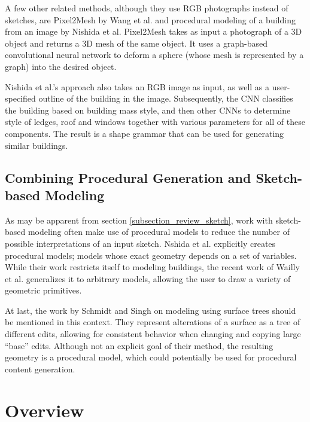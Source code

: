 \documentclass[english]{article}
\begin{document}
A few other related methods, although they use RGB photographs instead of sketches, are Pixel2Mesh \cite{pixel2mesh} by Wang et al. and procedural modeling of a building from an image \cite{procedural_building_from_image} by Nishida et al. Pixel2Mesh takes as input a photograph of a 3D object and returns a 3D mesh of the same object. It uses a graph-based convolutional neural network to deform a sphere (whose mesh is represented by a graph) into the desired object.

Nishida et al.'s approach also takes an RGB image as input, as well as a user-specified outline of the building in the image. Subsequently, the CNN classifies the building based on building mass style, and then other CNNs to determine style of ledges, roof and windows together with various parameters for all of these components. The result is a shape grammar that can be used for generating similar buildings.

\subsection{Combining Procedural Generation and Sketch-based Modeling}

As may be apparent from section \ref{subsection_review_sketch}, work with sketch-based modeling often make use of procedural models to reduce the number of possible interpretations of an input sketch. Nshida et al. \cite{sketch_based_urban_modeling} explicitly creates procedural models; models whose exact geometry depends on a set of variables. While their work restricts itself to modeling buildings, the recent work of Wailly et al. \cite{sketching_parameterized_models} generalizes it to arbitrary models, allowing the user to draw a variety of geometric primitives.

At last, the work by Schmidt and Singh \cite{schmidt08} on modeling using surface trees should be mentioned in this context. They represent alterations of a surface as a tree of different edits, allowing for consistent behavior when changing and copying large ``base'' edits. Although not an explicit goal of their method, the resulting geometry is a procedural model, which could potentially be used for procedural content generation.

\pagebreak

\section{Overview} \label{section_architecture}
\end{document}
